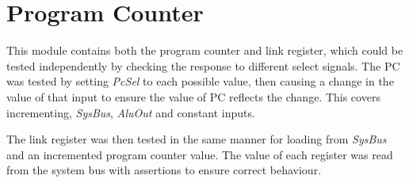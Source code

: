 
\section{Program Counter}


This module contains both the program counter and link register, which could be tested independently by checking the response to different select signals. The PC was tested by setting \textit{PcSel} to each possible value, then causing a change in the value of that input to ensure the value of PC reflects the change. This covers incrementing, \textit{SysBus}, \textit{AluOut} and constant inputs. 

The link register was then tested in the same manner for loading from \textit{SysBus} and an incremented program counter value. 
The value of each register was read from the system bus with assertions to ensure correct behaviour. 

